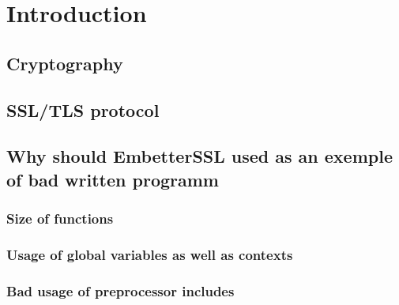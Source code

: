 \chapter{Introduction}

\section{Cryptography} %


\section{SSL/TLS protocol} %

\section{Why should EmbetterSSL used as an exemple of bad written programm}
\subsection{Size of functions}
\subsection{Usage of global variables as well as contexts}
\subsection{Bad usage of preprocessor includes}